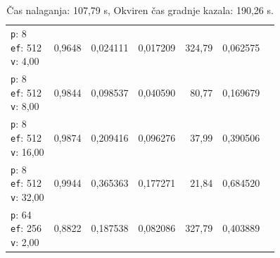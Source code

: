 \begin{table}[htbp]
\begin{tabularx}{\textwidth}{Xrrrrrr}
    \makecell{\texttt{p}: 8\\\texttt{ef}: 512\\\texttt{v}: 4,00} & 0,9648 & 0,024111 & 0,017209 & 324,79 & 0,062575 \\
    \makecell{\texttt{p}: 8\\\texttt{ef}: 512\\\texttt{v}: 8,00} & 0,9844 & 0,098537 & 0,040590 & 80,77 & 0,169679 \\
    \makecell{\texttt{p}: 8\\\texttt{ef}: 512\\\texttt{v}: 16,00} & 0,9874 & 0,209416 & 0,096276 & 37,99 & 0,390506 \\
    \makecell{\texttt{p}: 8\\\texttt{ef}: 512\\\texttt{v}: 32,00} & 0,9944 & 0,365363 & 0,177271 & 21,84 & 0,684520 \\
    \makecell{\texttt{p}: 64\\\texttt{ef}: 256\\\texttt{v}: 2,00} & 0,8822 & 0,187538 & 0,082086 & 327,79 & 0,403889 \\
    \bottomrule
  \end{tabularx}
\caption* {Čas nalaganja: 107,79 s, Okviren čas gradnje kazala: 190,26 s.}\end{table}

